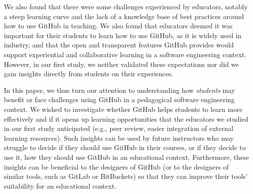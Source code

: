  We also found that there were some challenges experienced by educators, notably a steep learning curve and the lack of a knowledge base of best practices around how to use GitHub in teaching.  We also found that educators deemed it was important for their students to learn how to use GitHub, as it is widely used in industry, and that the open and transparent features GitHub provides would support experiential and collaborative learning in a software engineering context. However, in our first study, we neither validated these expectations nor did we gain insights directly from students on their experiences.  

In this paper, we thus turn our attention to understanding how \emph{students} may benefit or face challenges using GitHub in a pedagogical software engineering context.  We wished to investigate whether GitHub helps students to learn more effectively and if it opens up learning opportunities that the educators we studied in our first study anticipated (e.g., peer review, easier integration of external learning resources). Such insights can be used by future instructors who may struggle to decide if they should use GitHub in their courses, or if they decide to use it, how they should use GitHub in an educational context.   Furthermore, these insights can be beneficial to the designers of GitHub (or to the designers of similar tools, such as GitLab or BitBuckets) so that they can improve their tools' suitability for an educational context. 





